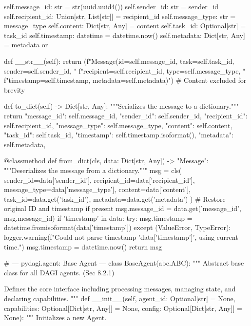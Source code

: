 \documentclass{amsbook}
\theoremstyle{definition}
\theoremstyle{remark}
\numberwithin{equation}{chapter} %
\begin{document}
\begin{python}
        self.message_id: str = str(uuid.uuid4())
        self.sender_id: str = sender_id
        self.recipient_id: Union[str, List[str]] = recipient_id
        self.message_type: str = message_type
        self.content: Dict[str, Any] = content
        self.task_id: Optional[str] = task_id
        self.timestamp: datetime = datetime.now()
        self.metadata: Dict[str, Any] = metadata or {}

    def __str__(self):
        return (f"Message(id={self.message_id}, task={self.task_id}, sender={self.sender_id}, "
                f"recipient={self.recipient_id}, type={self.message_type}, "
                f"timestamp={self.timestamp}, metadata={self.metadata})") # Content excluded for brevity

    def to_dict(self) -> Dict[str, Any]:
        """Serializes the message to a dictionary."""
        return {
            "message_id": self.message_id,
            "sender_id": self.sender_id,
            "recipient_id": self.recipient_id,
            "message_type": self.message_type,
            "content": self.content,
            "task_id": self.task_id,
            "timestamp": self.timestamp.isoformat(),
            "metadata": self.metadata,
        }

    @classmethod
    def from_dict(cls, data: Dict[str, Any]) -> "Message":
        """Deserializes the message from a dictionary."""
        msg = cls(
            sender_id=data['sender_id'],
            recipient_id=data['recipient_id'],
            message_type=data['message_type'],
            content=data['content'],
            task_id=data.get('task_id'),
            metadata=data.get('metadata')
        )
        # Restore original ID and timestamp if present
        msg.message_id = data.get('message_id', msg.message_id)
        if 'timestamp' in data:
             try:
                 msg.timestamp = datetime.fromisoformat(data['timestamp'])
             except (ValueError, TypeError):
                  logger.warning(f"Could not parse timestamp '{data['timestamp']}', using current time.")
                  msg.timestamp = datetime.now()
        return msg


# --- pydagi.agent: Base Agent ---
class BaseAgent(abc.ABC):
    """
    Abstract base class for all DAGI agents. (Sec 8.2.1)

    Defines the core interface including processing messages, managing state,
    and declaring capabilities.
    """
    def __init__(self, agent_id: Optional[str] = None, capabilities: Optional[Dict[str, Any]] = None, config: Optional[Dict[str, Any]] = None):
        """
        Initializes a new Agent.


\end{python}
\end{document}
